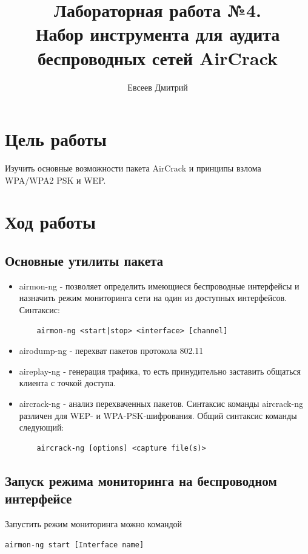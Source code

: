 \documentclass[10pt,a4paper]{report}
\author{Евсеев Дмитрий}
\title{Лабораторная работа №4.\\
	Набор инструмента для аудита беспроводных сетей AirCrack}
\begin{document}
\maketitle
\tableofcontents
\pagebreak

\section{Цель работы}

Изучить основные возможности пакета AirCrack и принципы взлома WPA/WPA2 PSK и WEP.

\section{Ход работы}

\subsection{Основные утилиты пакета}

\begin{itemize}
	\item airmon-ng - позволяет определить имеющиеся беспроводные интерфейсы и назначить режим мониторинга сети на один из доступных интерфейсов. Синтаксис:
	
	\begin{verbatim}
	airmon-ng <start|stop> <interface> [channel]
	\end{verbatim}
	
	\item airodump-ng - перехват пакетов протокола 802.11
	\item aireplay-ng - генерация трафика, то есть принудительно заставить общаться клиента с точкой доступа.
	\item aircrack-ng - анализ перехваченных пакетов. Синтаксис команды aircrack-ng различен для WEP- и WPA-PSK-шифрования. Общий синтаксис команды следующий:
	
	\begin{verbatim}
	aircrack-ng [options] <capture file(s)>
	\end{verbatim}
	
\end{itemize}

\subsection{Запуск режима мониторинга на беспроводном интерфейсе}
Запустить режим мониторинга можно командой
\begin{verbatim}
airmon-ng start [Interface name]
\end{verbatim}
\end{document}
